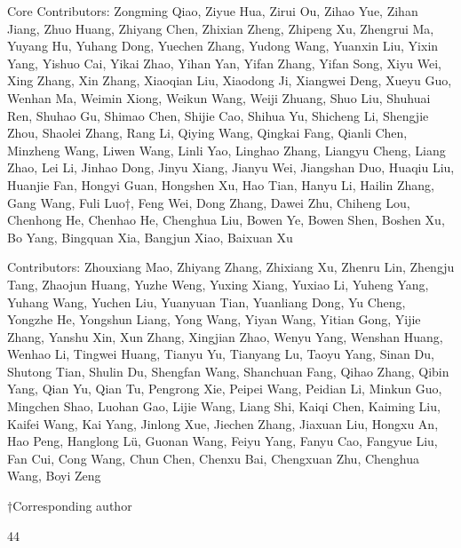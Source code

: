 \documentclass[
  10
]{article}
\begin{document}
Core Contributors: Zongming Qiao, Ziyue Hua, Zirui Ou, Zihao Yue, Zihan
Jiang, Zhuo Huang, Zhiyang Chen, Zhixian Zheng, Zhipeng Xu, Zhengrui Ma,
Yuyang Hu, Yuhang Dong, Yuechen Zhang, Yudong Wang, Yuanxin Liu, Yixin
Yang, Yishuo Cai, Yikai Zhao, Yihan Yan, Yifan Zhang, Yifan Song, Xiyu
Wei, Xing Zhang, Xin Zhang, Xiaoqian Liu, Xiaodong Ji, Xiangwei Deng,
Xueyu Guo, Wenhan Ma, Weimin Xiong, Weikun Wang, Weiji Zhuang, Shuo Liu,
Shuhuai Ren, Shuhao Gu, Shimao Chen, Shijie Cao, Shihua Yu, Shicheng Li,
Shengjie Zhou, Shaolei Zhang, Rang Li, Qiying Wang, Qingkai Fang, Qianli
Chen, Minzheng Wang, Liwen Wang, Linli Yao, Linghao Zhang, Liangyu
Cheng, Liang Zhao, Lei Li, Jinhao Dong, Jinyu Xiang, Jianyu Wei,
Jiangshan Duo, Huaqiu Liu, Huanjie Fan, Hongyi Guan, Hongshen Xu, Hao
Tian, Hanyu Li, Hailin Zhang, Gang Wang, Fuli Luo†, Feng Wei, Dong
Zhang, Dawei Zhu, Chiheng Lou, Chenhong He, Chenhao He, Chenghua Liu,
Bowen Ye, Bowen Shen, Boshen Xu, Bo Yang, Bingquan Xia, Bangjun Xiao,
Baixuan Xu

Contributors: Zhouxiang Mao, Zhiyang Zhang, Zhixiang Xu, Zhenru Lin,
Zhengju Tang, Zhaojun Huang, Yuzhe Weng, Yuxing Xiang, Yuxiao Li, Yuheng
Yang, Yuhang Wang, Yuchen Liu, Yuanyuan Tian, Yuanliang Dong, Yu Cheng,
Yongzhe He, Yongshun Liang, Yong Wang, Yiyan Wang, Yitian Gong, Yijie
Zhang, Yanshu Xin, Xun Zhang, Xingjian Zhao, Wenyu Yang, Wenshan Huang,
Wenhao Li, Tingwei Huang, Tianyu Yu, Tianyang Lu, Taoyu Yang, Sinan Du,
Shutong Tian, Shulin Du, Shengfan Wang, Shanchuan Fang, Qihao Zhang,
Qibin Yang, Qian Yu, Qian Tu, Pengrong Xie, Peipei Wang, Peidian Li,
Minkun Guo, Mingchen Shao, Luohan Gao, Lijie Wang, Liang Shi, Kaiqi
Chen, Kaiming Liu, Kaifei Wang, Kai Yang, Jinlong Xue, Jiechen Zhang,
Jiaxuan Liu, Hongxu An, Hao Peng, Hanglong Lü, Guonan Wang, Feiyu Yang,
Fanyu Cao, Fangyue Liu, Fan Cui, Cong Wang, Chun Chen, Chenxu Bai,
Chengxuan Zhu, Chenghua Wang, Boyi Zeng

†Corresponding author

44
\end{document}
